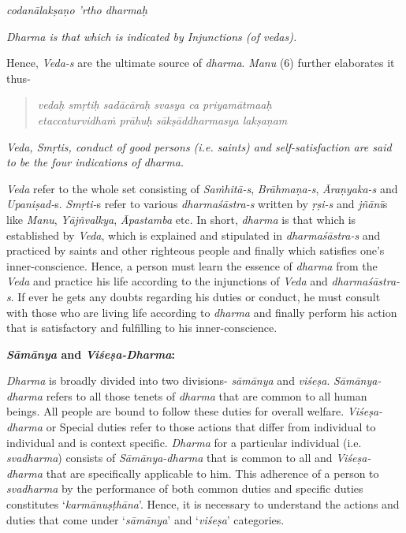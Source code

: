 \emph{codanālakṣaṇo 'rtho dharmaḥ }

\emph{Dharma is that which is indicated by Injunctions (of vedas).}

Hence, \emph{Veda-s} are the ultimate source of \emph{dharma}. \emph{Manu} (6) further elaborates it thus-

\begin{verse}
\emph{vedaḥ smṛtiḥ sadācāraḥ svasya ca priyamātmaaḥ }\\
\emph{etaccaturvidhaṁ prāhuḥ sākṣāddharmasya lakṣaṇam }
\end{verse}

\emph{Veda, Smṛtis, conduct of good persons (i.e. saints) and self-satisfaction are said to be the four indications of dharma.}

\emph{Veda} refer to the whole set consisting of \emph{Saṁhitā-s}, \emph{Brāhmaṇa-s}, \emph{Āraṇyaka-s} and \emph{Upaniṣad-}s. \emph{Smṛti-}s refer to various \emph{dharmaśāstra-s} written by \emph{ṛṣi-s} and \emph{jñānī}s like \emph{Manu}, \emph{Yājñvalkya}, \emph{Āpastamba} etc. In short, \emph{dharma} is that which is established by \emph{Veda}, which is explained and stipulated in \emph{dharmaśāstra-s} and practiced by saints and other righteous people and finally which satisfies one's inner-conscience. Hence, a person must learn the essence of \emph{dharma} from the \emph{Veda} and practice his life according to the injunctions of \emph{Veda} and \emph{dharmaśāstra-s}. If ever he gets any doubts regarding his duties or conduct, he must consult with those who are living life according to \emph{dharma} and finally perform his action that is satisfactory and fulfilling to his inner-conscience.

\textbf{\emph{Sāmānya} and \emph{Viśeṣa-Dharma}:}

\emph{Dharma} is broadly divided into two divisions- \emph{sāmānya} and \emph{viśeṣa}. \emph{Sāmānya-dharma} refers to all those tenets of \emph{dharma} that are common to all human beings. All people are bound to follow these duties for overall welfare. \emph{Viśeṣa-dharma} or Special duties refer to those actions that differ from individual to individual and is context specific. \emph{Dharma} for a particular individual (i.e. \emph{svadharma}) consists of \emph{Sāmānya-dharma} that is common to all and \emph{Viśeṣa-dharma} that are specifically applicable to him. This adherence of a person to \emph{svadharma} by the performance of both common duties and specific duties constitutes `\emph{karmānuṣṭhāna}'. Hence, it is necessary to understand the actions and duties that come under `\emph{sāmānya}' and `\emph{viśeṣa}' categories.

